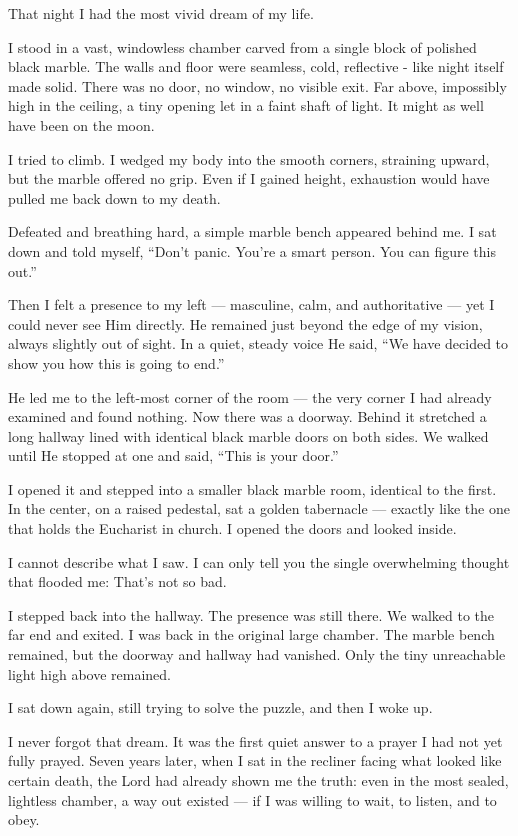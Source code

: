 \documentclass[12pt,a4paper]{book}
\begin{document}
That night I had the most vivid dream of my life.

I stood in a vast,  windowless chamber carved from a single block of polished black marble.  The walls and floor were seamless, cold, reflective - like night itself made solid.  There was no door, no window, no visible exit. Far above, impossibly high in the ceiling, a tiny opening let in a faint shaft of light.  It might as well have been on the moon.

I tried to climb.  I wedged my body into the smooth corners, straining upward, but the marble offered no grip. Even if I gained height, exhaustion would have pulled me back down to my death.

Defeated and breathing hard, a simple marble bench appeared behind me. I sat down and told myself, “Don’t panic.  You’re a smart person.  You can figure this out.”

Then I felt a presence to my left — masculine, calm, and authoritative — yet I could never see Him directly.  He remained just beyond the edge of my vision, always slightly out of sight.  In a quiet, steady voice He said, “We have decided to show you how this is going to end.”  

He led me to the left-most corner of the room — the very corner I had already examined and found nothing. Now there was a doorway. Behind it stretched a long hallway lined with identical black marble doors on both sides. We walked until He stopped at one and said, “This is your door.”

I opened it and stepped into a smaller black marble room, identical to the first. In the center, on a raised pedestal, sat a golden tabernacle — exactly like the one that holds the Eucharist in church. I opened the doors and looked inside.

I cannot describe what I saw. I can only tell you the single overwhelming thought that flooded me: That’s not so bad.

I stepped back into the hallway. The presence was still there. We walked to the far end and exited. I was back in the original large chamber. The marble bench remained, but the doorway and hallway had vanished. Only the tiny unreachable light high above remained.

I sat down again, still trying to solve the puzzle, and then I woke up.

I never forgot that dream. It was the first quiet answer to a prayer I had not yet fully prayed. Seven years later, when I sat in the recliner facing what looked like certain death, the Lord had already shown me the truth: even in the most sealed, lightless chamber, a way out existed — if I was willing to wait, to listen, and to obey.
\end{document}
